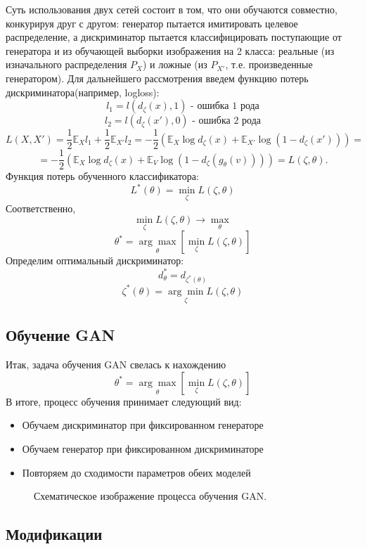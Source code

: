 		Суть использования двух сетей состоит в том, что они обучаются совместно, конкурируя друг с другом: генератор пытается имитировать целевое распределение, а дискриминатор пытается классифицировать поступающие от генератора и из обучающей выборки изображения на 2 класса: реальные (из изначального распределения $P_X$) и ложные (из $P_{X'}$, т.е. произведенные генератором).
		Для дальнейшего рассмотрения введем функцию потерь дискриминатора(например, logloss):
		$$ l_1 = l(d_{\zeta}(x), 1) \text{ - ошибка 1 рода} $$
		$$ l_2 = l(d_{\zeta}(x'), 0) \text{ - ошибка 2 рода}$$
		$$ L(X, X') = \frac{1}{2} \mathbb{E}_{X} l_1 + \frac{1}{2} \mathbb{E}_{X'} l_2 = -\frac{1}{2} (\mathbb{E}_{X} \log d_{\zeta}(x) + \mathbb{E}_{X'} \log (1 - d_{\zeta}(x'))) = $$
		$$ =  -\frac{1}{2} (\mathbb{E}_{X} \log d_{\zeta}(x) + \mathbb{E}_{V} \log (1 - d_{\zeta}(g_{\theta}(v)))) = L(\zeta, \theta) .$$
		Функция потерь обученного классификатора:
		$$ L^*(\theta) = \underset{\zeta}{\min} L(\zeta, \theta) $$
		Соответственно,
		$$ \underset{\zeta}{\min} L(\zeta, \theta) \longrightarrow \underset{\theta}{\max} $$
		$$ \theta^* = \underset{\theta}{\arg\max} \left[ \underset{\zeta}{\min} L(\zeta, \theta) \right] $$
		Определим оптимальный дискриминатор:
		$$ d^*_{\theta} = d_{\zeta^*(\theta)} $$
		$$ \zeta^*(\theta) =  \underset{\zeta}{\arg\min} L(\zeta, \theta)$$
	\subsection{Обучение GAN}
		Итак, задача обучения GAN свелась к нахождению
		$$ \theta^* = \underset{\theta}{\arg\max} \left[ \underset{\zeta}{\min} L(\zeta, \theta) \right] $$
		В итоге, процесс обучения принимает следующий вид:
		\begin{itemize}
			\item Обучаем дискриминатор при фиксированном генераторе
			\item Обучаем генератор при фиксированном дискриминаторе
			\item Повторяем до сходимости параметров обеих моделей
		\end{itemize}
		\begin{figure}
			\caption{Схематическое изображение процесса обучения GAN.}
			\label{gan-training}
		\end{figure}
	\subsection{Модификации}
